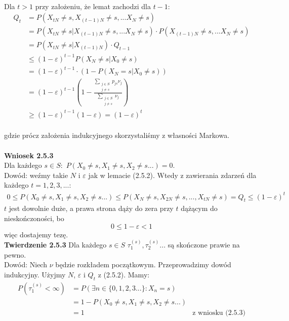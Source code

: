 \documentclass[a4paper]{article}
\begin{document}
\\
Dla $t > 1$ przy założeniu, że lemat zachodzi dla $t-1$:
\begin{align*}
Q_{t} &= P(X_{tN} \neq s, X_{(t-1)N} \neq s, ... X_N \neq s) \\
&= P(X_{tN} \neq s | X_{(t-1)N} \neq s, ... X_N \neq s) \cdot P(X_{(t-1)N} \neq s, ... X_N \neq s) \\
&= P(X_{tN} \neq s | X_{(t-1)N}) \cdot Q_{t-1}\\
&\leq (1- \varepsilon)^{t-1} P(X_N \neq s|X_0 \neq s) \\
&= (1- \varepsilon)^{t-1} \cdot (1 - P(X_N = s|X_0 \neq s)) \\
&= (1- \varepsilon)^{t-1} \left(1 - \frac{\sum_{\substack{j \in S\\j \neq s}} p_{js}\nu_j}{\sum_{\substack{j \in S\\j \neq s}} \nu_j}\right) \\
&\geq (1-\varepsilon)^{t-1} (1-\varepsilon) = (1-\varepsilon)^t
\end{align*}
\\
gdzie prócz założenia indukcyjnego skorzystaliśmy z własności Markowa.
\\\\
\textbf{Wniosek 2.5.3}\\
Dla każdego $s \in S: \,\, P(X_0 \neq s, X_{1} \neq s, X_2 \neq s ...) = 0$.\\
Dowód: weźmy takie $N$ i $\varepsilon$ jak w lemacie (2.5.2). Wtedy z zawierania zdarzeń dla każdego $t = 1,2,3,...$:
\begin{align*}
0 \leq P(X_0 \neq s, X_{1} \neq s, X_2 \neq s ...) \leq P(X_N \neq s, X_{2N} \neq s, ..., X_{tN} \neq s) = Q_t \leq (1-\varepsilon)^t
\end{align*}
$t$ jest dowolnie duże, a prawa strona dąży do zera przy $t$ dążącym do nieskończoności, bo $$0 \leq 1 - \varepsilon < 1$$ więc dostajemy tezę.
\\
\textbf{Twierdzenie 2.5.3}
Dla każdego $s\in S$ $\tau_1^{(s)}, \tau_2^{(s)}...$ są skończone prawie na pewno.\\
Dowód: Niech $\nu$ będzie rozkładem początkowym. Przeprowadzimy dowód indukcyjny. Użyjmy $N$, $\varepsilon$ i $Q_t$ z (2.5.2). Mamy:
\begin{align*}
P(\tau_1^{(s)}< \infty) &= P(\exists n \in \{0,1,2,3...\}: X_n = s) \\
&= 1 - P(X_0 \neq s, X_{1} \neq s, X_2 \neq s ...) \\
&= 1 & \text{z wniosku (2.5.3)}
\end{align*}
\end{document}
